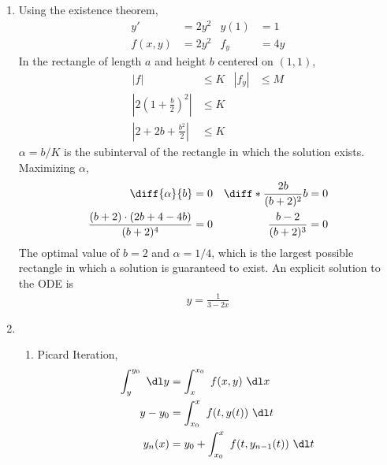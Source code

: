 \begin{enumerate}
    \item Using the existence theorem,
          \begin{align}
              y'      & = 2y^{2} & y(1)  & = 1  \\
              f(x, y) & = 2y^{2} & f_{y} & = 4y
          \end{align}
          In the rectangle of length $ a $ and height $ b $ centered on $ (1, 1) $,
          \begin{align}
              |f|                                               & \leq K & |f_{y}| & \leq M \\
              \left| 2\left( 1 + \frac{b}{2} \right)^{2}\right| & \leq K                    \\
              \left| 2 + 2b + \frac{b^{2}}{2} \right|           & \leq K
          \end{align}
          $ \alpha = b/K$ is the subinterval of the rectangle in which the solution
          exists. Maximizing $ \alpha $,
          \begin{align}
              \diff{\alpha}{b}                        & = 0 & \diff*{\frac{2b}{(b+2)^{2}}}{b} & = 0 \\
              \frac{(b+2) \cdot (2b+4-4b)}{(b+2)^{4}} & = 0 & \frac{b-2}{(b+2)^{3}}           & = 0
          \end{align}
          The optimal value of $ b = 2 $ and $ \alpha = 1/4 $, which is the largest possible
          rectangle in which a solution is guaranteed to exist.
          An explicit solution to the ODE is
          \begin{align}
              y = \frac{1}{3 - 2x}
          \end{align}

    \item \begin{enumerate}
              \item Picard Iteration,
                    \begin{align}
                        \int_{y}^{y_{0}}\  \dl y & = \int_{x}^{x_{0}}\ f(x, y)\ \dl x                  \\
                        y - y_{0}                & = \int_{x_{0}}^{x}\ f(t, y(t))\ \dl t               \\
                        y_{n}(x)                 & = y_{0} + \int_{x_{0}}^{x}\ f(t, y_{n-1}(t))\ \dl t
                    \end{align}


\end{enumerate}
\end{enumerate}
